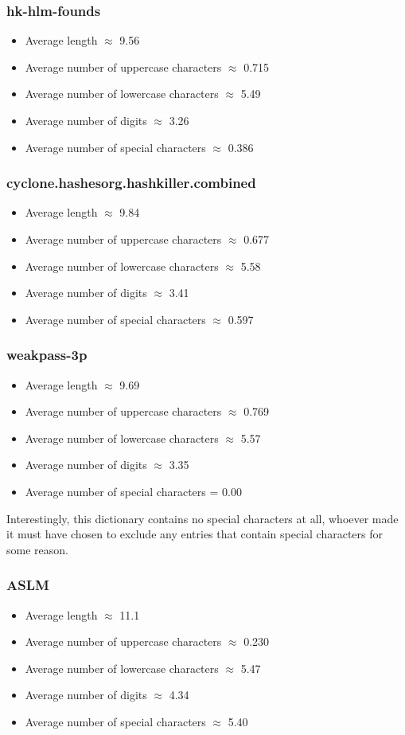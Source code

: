 \documentclass[11pt]{article}
\begin{document}
\subsubsection{hk-hlm-founds}
\begin{itemize}
\setlength\itemsep{-.5em}
\item Average length $\approx$ 9.56
\item Average number of uppercase characters $\approx$ 0.715
\item Average number of lowercase characters $\approx$ 5.49
\item Average number of digits $\approx$ 3.26
\item Average number of special characters $\approx$ 0.386
\end{itemize}
\subsubsection{cyclone.hashesorg.hashkiller.combined}
\begin{itemize}
\setlength\itemsep{-.5em}
\item Average length $\approx$ 9.84
\item Average number of uppercase characters $\approx$ 0.677
\item Average number of lowercase characters $\approx$ 5.58
\item Average number of digits $\approx$ 3.41
\item Average number of special characters $\approx$ 0.597
\end{itemize}
\subsubsection{weakpass-3p}
\begin{itemize}
\setlength\itemsep{-.5em}
\item Average length $\approx$ 9.69
\item Average number of uppercase characters $\approx$ 0.769
\item Average number of lowercase characters $\approx$ 5.57
\item Average number of digits $\approx$ 3.35
\item Average number of special characters = 0.00
\end{itemize}
Interestingly, this dictionary contains no special characters at all, whoever made it must have chosen to exclude any entries that contain special characters for some reason.
\subsubsection{ASLM}
\begin{itemize}
\setlength\itemsep{-.5em}
\item Average length $\approx$ 11.1
\item Average number of uppercase characters $\approx$ 0.230
\item Average number of lowercase characters $\approx$ 5.47
\item Average number of digits $\approx$ 4.34
\item Average number of special characters $\approx$ 5.40
\end{itemize}
\end{document}
